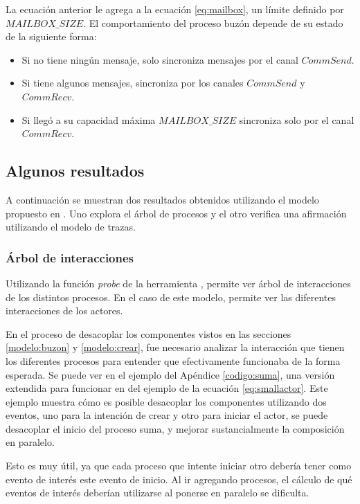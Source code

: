 La ecuación anterior le agrega a la ecuación \eqref{eq:mailbox}, un límite definido por $MAILBOX\_SIZE$. El comportamiento del proceso buzón depende de su estado de la siguiente forma:

\begin{itemize}
\item Si no tiene ningún mensaje, solo sincroniza mensajes por el canal $CommSend$.
\item Si tiene algunos mensajes, sincroniza por los canales $CommSend$ y $CommRecv$.
\item Si llegó a su capacidad máxima $MAILBOX\_SIZE$ sincroniza solo por el canal $CommRecv$.
\end{itemize}

\subsection{Algunos resultados}

A continuación se muestran dos resultados obtenidos utilizando el modelo propuesto en \CSPm. Uno explora el árbol de procesos y el otro verifica una afirmación utilizando el modelo de trazas.

\subsubsection*{Árbol de interacciones}

Utilizando la función \textit{probe} de la herramienta \FDR, permite ver árbol de interacciones de los distintos procesos. En el caso de este modelo, permite ver las diferentes interacciones de los actores.

En el proceso de desacoplar los componentes vistos en las secciones \ref{modelo:buzon} y \ref{modelo:crear}, fue necesario analizar la interacción que tienen los diferentes procesos para entender que efectivamente funcionaba de la forma esperada. Se puede ver en el ejemplo del Apéndice \ref{codigo:suma}, una versión extendida para funcionar en \FDR del ejemplo de la ecuación \ref{eq:smallactor}. Este ejemplo muestra cómo es posible desacoplar los componentes utilizando dos eventos, uno para la intención de crear y otro para iniciar el actor, se puede desacoplar el inicio del proceso suma, y mejorar sustancialmente la composición en paralelo. 

Esto es muy útil, ya que cada proceso que intente iniciar otro debería tener como evento de interés este evento de inicio. Al ir agregando procesos, el cálculo de qué eventos de interés deberían utilizarse al ponerse en paralelo se dificulta. 


